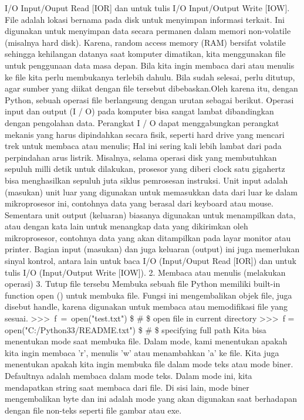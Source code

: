I/O Input/Ouput Read [IOR] dan untuk tulis I/O Input/Output Write [IOW]. File adalah lokasi bernama pada disk untuk menyimpan informasi terkait. Ini digunakan untuk menyimpan data secara permanen dalam memori non-volatile (misalnya hard disk). Karena, random access memory (RAM) bersifat volatile sehingga kehilangan datanya saat komputer dimatikan, kita menggunakan file untuk penggunaan data masa depan. Bila kita ingin membaca dari atau menulis ke file kita perlu membukanya terlebih dahulu. Bila sudah selesai, perlu ditutup, agar sumber yang diikat dengan file tersebut dibebaskan.Oleh karena itu, dengan Python, sebuah operasi file berlangsung dengan urutan sebagai berikut. 
Operasi input dan output (I / O) pada komputer bisa sangat lambat dibandingkan dengan pengolahan data. Perangkat I / O dapat menggabungkan perangkat mekanis yang harus dipindahkan secara fisik, seperti hard drive yang mencari trek untuk membaca atau menulis; Hal ini sering kali  lebih lambat dari pada perpindahan arus listrik. Misalnya, selama operasi disk yang membutuhkan sepuluh milli detik untuk dilakukan, prosesor yang diberi clock satu gigahertz bisa menghasilkan sepuluh juta siklus pemrosesan instruksi. 
Unit input adalah (masukan) unit luar yang digunakan untuk memasukkan data dari luar ke dalam mikroprosesor ini, contohnya data yang berasal dari keyboard atau mouse. Sementara unit output (keluaran) biasanya digunakan untuk menampilkan data, atau dengan kata lain untuk menangkap data yang dikirimkan oleh mikroprosesor, contohnya data yang akan ditampilkan pada layar monitor atau printer.
Bagian input (masukan) dan juga keluaran (output) ini juga memerlukan sinyal kontrol, antara lain untuk baca I/O (Input/Ouput Read [IOR]) dan untuk tulis I/O (Input/Output Write [IOW]).  
2. \hspace*{0.5in} Membaca atau menulis (melakukan operasi)  
3. \hspace*{0.5in} Tutup file tersebu 
Membuka sebuah file  
Python memiliki built-in function open () untuk membuka file. Fungsi ini mengembalikan objek file, juga disebut handle, karena digunakan untuk membaca atau memodifikasi file yang sesuai.  
>>>~f~=~open("test.txt")     \$  \#  \$ open file in current directory  
>>>~f = open("C:/Python33/README.txt")   \$  \#  \$ specifying full path 
Kita bisa menentukan mode saat membuka file. Dalam mode, kami menentukan apakah kita ingin membaca 'r', menulis 'w' atau menambahkan 'a' ke file. Kita juga menentukan apakah kita ingin membuka file dalam mode teks atau mode biner. Defaultnya adalah membaca dalam mode teks. Dalam mode ini, kita mendapatkan string saat membaca dari file. Di sisi lain, mode biner mengembalikan byte dan ini adalah mode yang akan digunakan saat berhadapan dengan file non-teks seperti file gambar atau exe.  
